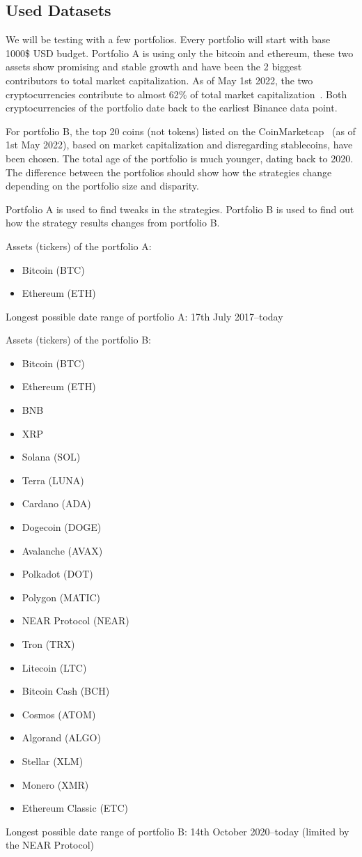 \subsection*{Used Datasets}
We will be testing with a few portfolios. Every portfolio will start with base 1000\$ USD budget. Portfolio A is using only the bitcoin and ethereum, these two assets show promising and stable growth and have been the 2 biggest contributors to total market capitalization. As of May 1st 2022, the two cryptocurrencies contribute to almost 62\% of total market capitalization~\cite{coinmarketcap:globalmetrics}. Both cryptocurrencies of the portfolio date back to the earliest Binance data point.

For portfolio B, the top 20 coins (not tokens) listed on the CoinMarketcap~\cite{coinmarketcap} (as of 1st May 2022), based on market capitalization and disregarding stablecoins, have been chosen. The total age of the portfolio is much younger, dating back to 2020. The difference between the portfolios should show how the strategies change depending on the portfolio size and disparity.

Portfolio A is used to find tweaks in the strategies. Portfolio B is used to find out how the strategy results changes from portfolio B.

Assets (tickers) of the portfolio A:
\begin{itemize}
    \item Bitcoin (BTC)
    \item Ethereum (ETH)
\end{itemize}
Longest possible date range of portfolio A: 17th July 2017--today

Assets (tickers) of the portfolio B:
\begin{itemize}
    \item Bitcoin (BTC)
    \item Ethereum (ETH)
    \item BNB
    \item XRP
    \item Solana (SOL)
    \item Terra (LUNA)
    \item Cardano (ADA)
    \item Dogecoin (DOGE)
    \item Avalanche (AVAX)
    \item Polkadot (DOT)
    \item Polygon (MATIC)
    \item NEAR Protocol (NEAR)
    \item Tron (TRX)
    \item Litecoin (LTC)
    \item Bitcoin Cash (BCH)
    \item Cosmos (ATOM)
    \item Algorand (ALGO)
    \item Stellar (XLM)
    \item Monero (XMR)
    \item Ethereum Classic (ETC)
\end{itemize}
Longest possible date range of portfolio B: 14th October 2020--today (limited by the NEAR Protocol)

